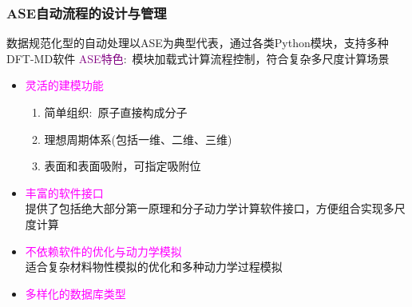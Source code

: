 \frame
{
	\frametitle{\textrm{ASE}自动流程的设计与管理}
数据规范化型的自动处理以\textrm{ASE}为典型代表，通过各类\textrm{Python}模块，支持多种\textrm{DFT-MD}软件%
\vskip 3pt
		\textcolor{purple}{\textrm{ASE}特色}:~模块加载式计算流程控制，符合复杂多尺度计算场景
		\begin{itemize}
			\item \textcolor{magenta}{灵活的建模功能}
				\begin{enumerate}
    \setlength{\itemsep}{7pt}
					\item 简单组织:~原子直接构成分子
					\item 理想周期体系(包括一维、二维、三维)
					\item 表面和表面吸附，可指定吸附位
				\end{enumerate}
			\item \textcolor{magenta}{丰富的软件接口}\\
				提供了包括绝大部分第一原理和分子动力学计算软件接口，方便组合实现多尺度计算
			\item \textcolor{magenta}{不依赖软件的优化与动力学模拟}\\
				适合复杂材料物性模拟的优化和多种动力学过程模拟
			\item \textcolor{magenta}{多样化的数据库类型}
		\end{itemize} 
}

